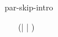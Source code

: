 \begin{circuslaw}{par-skip-intro}
\begin{circusaction*}
  \Skip ~ \equiv ~ (\Skip \lpar \emptyset | \emptyset | \emptyset \rpar \Skip)
\end{circusaction*}
\end{circuslaw}
